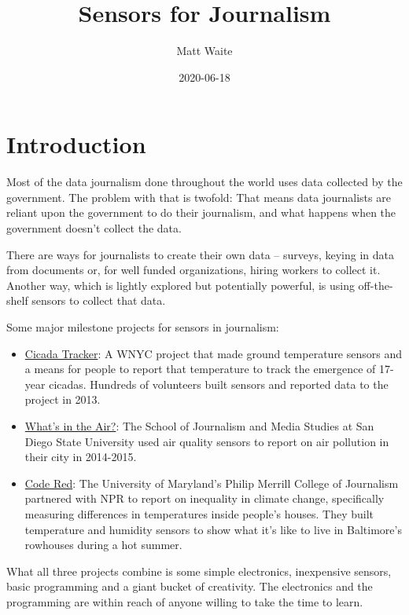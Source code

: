 \documentclass[
]{book}
\title{Sensors for Journalism}
\author{Matt Waite}
\date{2020-06-18}
\providecommand{\tightlist}{%
  \setlength{\itemsep}{0pt}\setlength{\parskip}{0pt}}
\begin{document}
\maketitle

{
\setcounter{tocdepth}{1}
\tableofcontents
}
\hypertarget{introduction}{%
\chapter*{Introduction}\label{introduction}}

Most of the data journalism done throughout the world uses data collected by the government. The problem with that is twofold: That means data journalists are reliant upon the government to do their journalism, and what happens when the government doesn't collect the data.

There are ways for journalists to create their own data -- surveys, keying in data from documents or, for well funded organizations, hiring workers to collect it. Another way, which is lightly explored but potentially powerful, is using off-the-shelf sensors to collect that data.

Some major milestone projects for sensors in journalism:

\begin{itemize}
\tightlist
\item
  \href{https://project.wnyc.org/cicadas/}{Cicada Tracker}: A WNYC project that made ground temperature sensors and a means for people to report that temperature to track the emergence of 17-year cicadas. Hundreds of volunteers built sensors and reported data to the project in 2013.
\item
  \href{https://inewsource.org/whats-in-the-air/}{What's in the Air?}: The School of Journalism and Media Studies at San Diego State University used air quality sensors to report on air pollution in their city in 2014-2015.
\item
  \href{https://cnsmaryland.org/interactives/summer-2019/code-red/behind-scenes.html}{Code Red}: The University of Maryland's Philip Merrill College of Journalism partnered with NPR to report on inequality in climate change, specifically measuring differences in temperatures inside people's houses. They built temperature and humidity sensors to show what it's like to live in Baltimore's rowhouses during a hot summer.
\end{itemize}

What all three projects combine is some simple electronics, inexpensive sensors, basic programming and a giant bucket of creativity. The electronics and the programming are within reach of anyone willing to take the time to learn.
\end{document}
